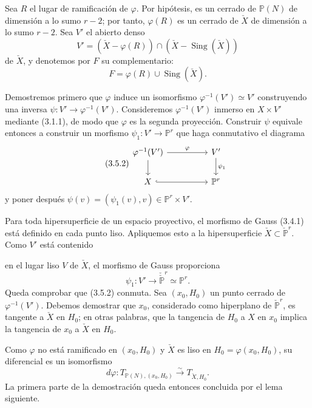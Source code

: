 \pageoriginale

Sea $R$ el lugar de ramificación de $\varphi$. Por hipótesis, es un
cerrado de $\mathbb P(N)$ de dimensión a lo sumo $r-2$; por tanto,
$\varphi(R)$ es un cerrado de $\check X$ de dimensión a lo sumo
$r-2$. Sea $V'$ el abierto denso
\begin{equation}\tag{3.5.1}
V'=(\check X-\varphi(R))\cap
   (\check X-\operatorname{Sing}(\check X))
\end{equation}
de $\check X$, y denotemos por $F$ su complementario:
\begin{equation}\tag{3.5.1.1}
F=\varphi(R)\cup\operatorname{Sing}(\check X).
\end{equation}

Demostremos primero que $\varphi$ induce un isomorfismo
$\varphi^{-1}(V')\simeq V'$ construyendo una inversa
$\psi:V'\to\varphi^{-1}(V')$. Consideremos
$\varphi^{-1}(V')$ inmerso en $X\times V'$ mediante (3.1.1), de modo
que $\varphi$ es la segunda proyección. Construir $\psi$ equivale
entonces a construir un morfismo $\psi_1:V'\to\mathbb P^r$ que haga
conmutativo el diagrama
\begin{equation}\tag{3.5.2}
\begin{tikzcd}[column sep=huge]
\varphi^{-1}(V') \arrow[r,"\varphi"] \arrow[d]
  & V' \arrow[d,"\psi_1"]\\
X \arrow[r,hook] & \mathbb P^r
\end{tikzcd}
\end{equation}
y poner después
$\psi(v)=(\psi_1(v),v)\in\mathbb P^r\times V'$.

Para toda hipersuperficie de un espacio proyectivo, el morfismo de
Gauss (3.4.1) está definido en cada punto liso. Apliquemos esto a la
hipersuperficie $\check X\subset\check{\mathbb P}^{r}$. Como $V'$
está contenido

\pageoriginale

en el lugar liso $V$ de $\check X$, el morfismo de Gauss proporciona
\begin{equation}\tag{3.5.3}
\psi_1:V'\longrightarrow
\check{\check{\mathbb P}}^{r}\simeq\mathbb P^r.
\end{equation}
Queda comprobar que (3.5.2) conmuta. Sea $(x_0,H_0)$ un punto cerrado
de $\varphi^{-1}(V')$. Debemos demostrar que $x_0$, considerado como
hiperplano de $\check{\mathbb P}^{r}$, es tangente a $\check X$ en
$H_0$; en otras palabras, que la tangencia de $H_0$ a $X$ en $x_0$
implica la tangencia de $x_0$ a $\check X$ en $H_0$.

Como $\varphi$ no está ramificado en $(x_0,H_0)$ y $\check X$ es liso
en $H_0=\varphi(x_0,H_0)$, su diferencial es un isomorfismo
\begin{equation}\tag{3.5.4}
d\varphi:
T_{\mathbb P(N),(x_0,H_0)}
\xrightarrow{\sim}T_{\check X,H_0}.
\end{equation}
La primera parte de la demostración queda entonces concluida por el
lema siguiente.

